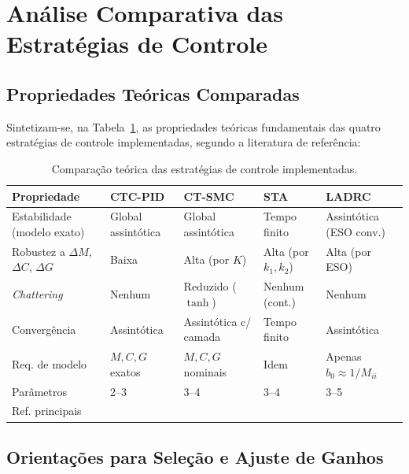 \section{Análise Comparativa das Estratégias de Controle}
\label{sec:comp_ctrl}

\subsection{Propriedades Teóricas Comparadas}

Sintetizam-se, na Tabela~\ref{tab:ctrl_comparison}, as propriedades teóricas fundamentais das quatro estratégias de controle implementadas, segundo a literatura de referência:

\begin{table}[h!]
\centering
\caption{Comparação teórica das estratégias de controle implementadas.}
\label{tab:ctrl_comparison}
\setlength{\tabcolsep}{4pt}
\begin{tabular}{p{2.6cm} p{2.0cm} p{2.0cm} p{2.2cm} p{3.5cm}}
\hline
\textbf{Propriedade} & \textbf{CTC-PID} & \textbf{CT-SMC} & \textbf{STA} & \textbf{LADRC} \\
\hline
Estabilidade (modelo exato) & Global assintótica & Global assintótica & Tempo finito & Assintótica (ESO conv.) \\
Robustez a $\Delta M$, $\Delta C$, $\Delta G$ & Baixa & Alta (por $K$) & Alta (por $k_1, k_2$) & Alta (por ESO) \\
\textit{Chattering} & Nenhum & Reduzido ($\tanh$) & Nenhum (cont.) & Nenhum \\
Convergência & Assintótica & Assintótica c/ camada & Tempo finito & Assintótica \\
Req. de modelo & $M, C, G$ exatos & $M, C, G$ nominais & Idem & Apenas $b_0 \approx 1/M_{ii}$ \\
Parâmetros & 2--3 & 3--4 & 3--4 & 3--5 \\
Ref. principais & \cite{craig1989introduction,spong2020robot} & \cite{slotine1991applied,edwards1998sliding} & \cite{levant1993sliding,moreno2012strict} & \cite{gao2003scaling,huang2014active} \\
\hline
\end{tabular}
\end{table}

\subsection{Orientações para Seleção e Ajuste de Ganhos}

